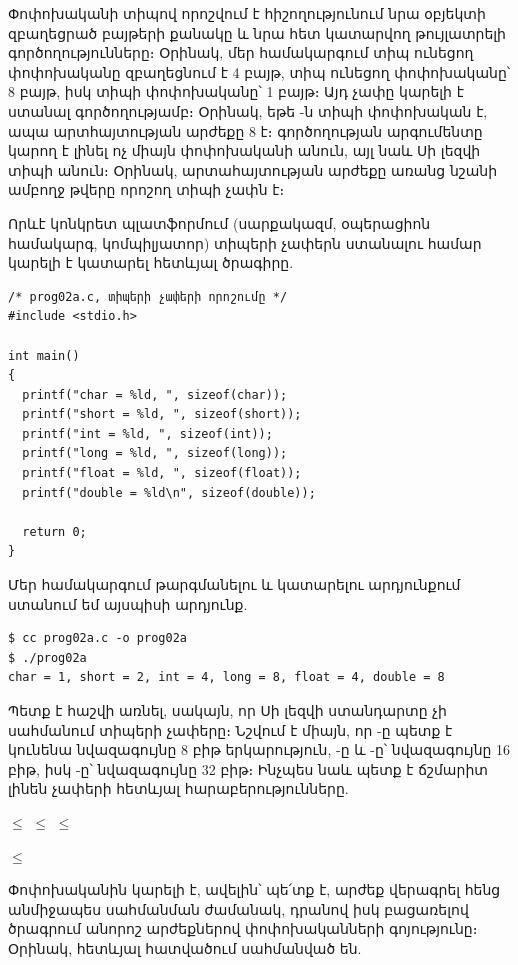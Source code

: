 Փոփոխականի տիպով որոշվում է հիշողությունում նրա օբյեկտի զբաղեցրած 
բայթերի քանակը և նրա հետ կատարվող թույլատրելի գործողությունները։ 
Օրինակ, մեր համակարգում  տիպ ունեցող փոփոխականը զբաղեցնում 
է 4 բայթ,  տիպ ունեցող փոփոխականը՝ 8 բայթ, իսկ 
 տիպի փոփոխականը՝ 1 բայթ։ Այդ չափը կարելի է ստանալ 
 գործողությամբ։ Օրինակ, եթե -ն 
 տիպի փոփոխական է, ապա  արտհայտության 
արժեքը 8 է։  գործողության արգումենտը կարող է լինել ոչ 
միայն փոփոխականի անուն, այլ նաև Սի լեզվի տիպի անուն։ Օրինակ, 
 արտահայտության արժեքը առանց նշանի 
ամբողջ թվերը որոշող տիպի չափն է։

Որևէ կոնկրետ պլատֆորմում (սարքակազմ, օպերացիոն համակարգ, կոմպիլյատոր)
տիպերի չափերն ստանալու համար կարելի է կատարել հետևյալ ծրագիրը.

\begin{Verbatim}
/* prog02a.c, տիպերի չափերի որոշումը */
#include <stdio.h>

int main()
{
  printf("char = %ld, ", sizeof(char));
  printf("short = %ld, ", sizeof(short));
  printf("int = %ld, ", sizeof(int));
  printf("long = %ld, ", sizeof(long));
  printf("float = %ld, ", sizeof(float));
  printf("double = %ld\n", sizeof(double));

  return 0;
}
\end{Verbatim}

Մեր համակարգում թարգմանելու և կատարելու արդյունքում ստանում եմ
այսպիսի արդյունք.

\begin{Verbatim}
$ cc prog02a.c -o prog02a
$ ./prog02a
char = 1, short = 2, int = 4, long = 8, float = 4, double = 8
\end{Verbatim}

Պետք է հաշվի առնել, սակայն, որ Սի լեզվի ստանդարտը չի սահմանում
տիպերի չափերը։ Նշվում է միայն, որ -ը պետք է կունենա
նվազագույնը 8 բիթ երկարություն, -ը և -ը՝
նվազագույնը 16 բիթ, իսկ -ը՝ նվազագույնը 32 բիթ։
Ինչպես նաև պետք է ճշմարիտ լինեն չափերի հետևյալ հարաբերությունները.

\begin{center}
 \(\le\)  \(\le\)
 \(\le\) 

 \(\le\) 
\end{center}

Փոփոխականին կարելի է, ավելին՝ պե՛տք է, արժեք վերագրել հենց 
անմիջապես սահմանման ժամանակ, դրանով իսկ բացառելով ծրագրում 
անորոշ արժեքներով փոփոխականների գոյությունը։ Օրինակ, հետևյալ 
հատվածում սահմանված են.

